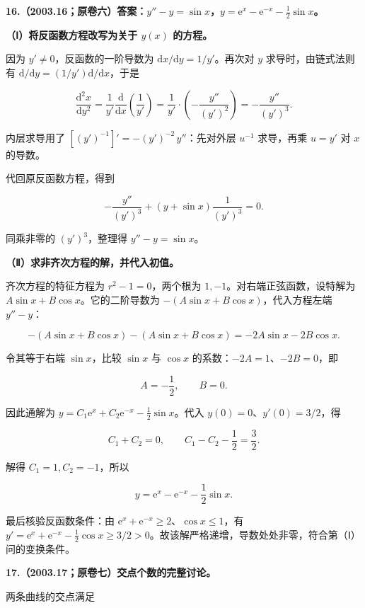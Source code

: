 \documentclass[UTF8,11pt,fontset=windows]{ctexart}
\begin{document}
\clearpage

\textbf{16.（2003.16；原卷六）答案：$y''-y=\sin x$，$y=\mathrm e^x-\mathrm e^{-x}-\tfrac12\sin x$。}

\textbf{（Ⅰ）将反函数方程改写为关于 $y(x)$ 的方程。}

因为 $y'\ne0$，反函数的一阶导数为 $\mathrm dx/\mathrm dy=1/y'$。再次对 $y$ 求导时，由链式法则有 $\mathrm d/\mathrm dy=(1/y')\mathrm d/\mathrm dx$，于是

$$
\frac{\mathrm d^2x}{\mathrm dy^2}
=\frac1{y'}\frac{\mathrm d}{\mathrm dx}\left(\frac1{y'}\right)
=\frac1{y'}\cdot\left(-\frac{y''}{(y')^2}\right)
=-\frac{y''}{(y')^3}.
$$

内层求导用了 $\left[(y')^{-1}\right]'=-(y')^{-2}\,y''$：先对外层 $u^{-1}$ 求导，再乘 $u=y'$ 对 $x$ 的导数。

代回原反函数方程，得到

$$
-\frac{y''}{(y')^3}+(y+\sin x)\frac1{(y')^3}=0.
$$

同乘非零的 $(y')^3$，整理得 $\boxed{y''-y=\sin x}$。

\textbf{（Ⅱ）求非齐次方程的解，并代入初值。}

齐次方程的特征方程为 $r^2-1=0$，两个根为 $1,-1$。对右端正弦函数，设特解为 $A\sin x+B\cos x$。它的二阶导数为 $-(A\sin x+B\cos x)$，代入方程左端 $y''-y$：

$$
-(A\sin x+B\cos x)-(A\sin x+B\cos x)
=-2A\sin x-2B\cos x.
$$

令其等于右端 $\sin x$，比较 $\sin x$ 与 $\cos x$ 的系数：$-2A=1$、$-2B=0$，即

$$
A=-\frac12,\qquad B=0.
$$

因此通解为 $y=C_1\mathrm e^x+C_2\mathrm e^{-x}-\tfrac12\sin x$。代入 $y(0)=0$、$y'(0)=3/2$，得

$$
C_1+C_2=0,
\qquad C_1-C_2-\frac12=\frac32.
$$

解得 $C_1=1,C_2=-1$，所以

$$
\boxed{y=\mathrm e^x-\mathrm e^{-x}-\frac12\sin x}.
$$

最后核验反函数条件：由 $\mathrm e^x+\mathrm e^{-x}\ge2$、$\cos x\le1$，有 $y'=\mathrm e^x+\mathrm e^{-x}-\tfrac12\cos x\ge3/2>0$。故该解严格递增，导数处处非零，符合第（Ⅰ）问的变换条件。

\clearpage

\textbf{17.（2003.17；原卷七）交点个数的完整讨论。}

两条曲线的交点满足
\end{document}
